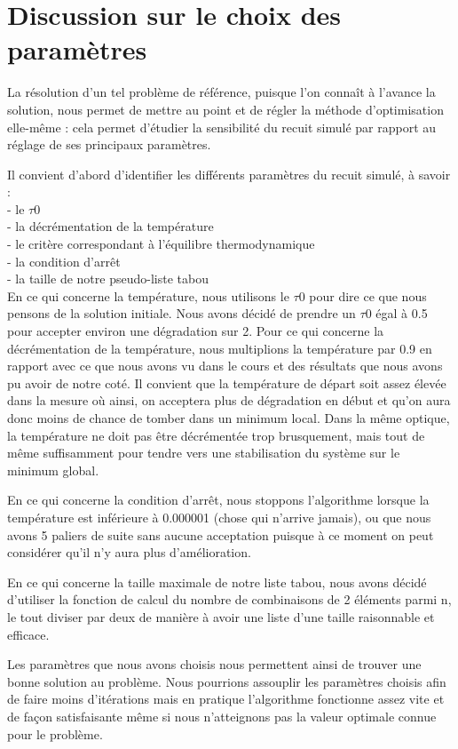 \documentclass{report}
\begin{document}
\section{Discussion sur le choix des paramètres}
La résolution d'un tel problème de référence, puisque l'on connaît à l'avance la solution, nous permet de mettre au point et de régler la méthode d'optimisation elle-même : cela permet d'étudier la sensibilité du recuit simulé par rapport au réglage de ses principaux paramètres.

Il convient d'abord d'identifier les différents paramètres du recuit simulé, à savoir :\\
- le $\tau 0$\\
- la décrémentation de la température\\
- le critère correspondant à l'équilibre thermodynamique\\
- la condition d'arrêt\\
- la taille de notre pseudo-liste tabou\\

En ce qui concerne la température, nous utilisons le $\tau 0$ pour dire ce que nous pensons de la solution initiale.
Nous avons décidé de prendre un $\tau 0$ égal à 0.5 pour accepter environ une dégradation sur 2. Pour ce qui concerne la
décrémentation de la température, nous multiplions la température par 0.9 en rapport avec ce que nous avons vu dans le
cours et des résultats que nous avons pu avoir de notre coté. Il convient que la température de départ soit assez élevée
dans la mesure où ainsi, on acceptera plus de dégradation en début et qu'on aura donc moins de chance de tomber dans un
minimum local. Dans la même optique, la température ne doit pas être décrémentée trop brusquement, mais tout de même suffisamment pour tendre vers une stabilisation du système sur le minimum global.

En ce qui concerne la condition d'arrêt, nous stoppons l'algorithme lorsque la température est inférieure à 0.000001
(chose qui n'arrive jamais), ou que nous avons 5 paliers de suite sans aucune acceptation puisque à ce moment on peut considérer qu'il n'y aura plus d'amélioration.

En ce qui concerne la taille maximale de notre liste tabou, nous avons décidé d'utiliser la fonction de calcul du nombre
de combinaisons de 2 éléments parmi n, le tout diviser par deux de manière à avoir une liste d'une taille raisonnable et efficace.

Les paramètres que nous avons choisis nous permettent ainsi de trouver une bonne solution au problème. Nous pourrions
assouplir les paramètres choisis afin de faire moins d'itérations mais en pratique l'algorithme fonctionne assez vite et
de façon satisfaisante même si nous n'atteignons pas la valeur optimale connue pour le problème.
\end{document}
